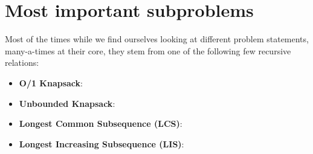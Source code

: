 \section{Most important subproblems}
Most of the times while we find ourselves looking at different problem statements, many-a-times at their core, they stem from one of the following few recursive relations:

\begin{itemize}
    \item \textbf{O/1 Knapsack}:
    \item \textbf{Unbounded Knapsack}:
    \item \textbf{Longest Common Subsequence (LCS)}:
    \item \textbf{Longest Increasing Subsequence (LIS)}:
\end{itemize}